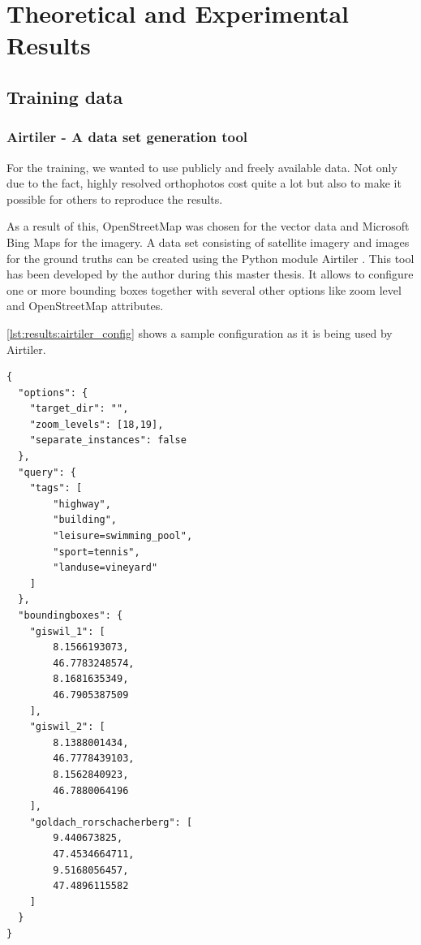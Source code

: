 
\chapter{Theoretical and Experimental Results}\label{chp:theoretical_and_experimental_results}
\section{Training data}
\subsection{Airtiler - A data set generation tool}
For the training, we wanted to use publicly and freely available data. Not only due to the fact, highly resolved orthophotos cost quite a lot but also to make it possible for others to reproduce the results.

As a result of this, OpenStreetMap was chosen for the vector data and Microsoft Bing Maps for the imagery. A data set consisting of satellite imagery and images for the ground truths can be created using the Python module Airtiler \cite{airtiler}. This tool has been developed by the author during this master thesis. It allows to configure one or more bounding boxes together with several other options like zoom level and OpenStreetMap attributes.

\autoref{lst:results:airtiler_config} shows a sample configuration as it is being used by Airtiler.

\begin{minipage}{\linewidth}
\begin{lstlisting}[caption={Sample configuration for Airtiler},captionpos=b,label=lst:results:airtiler_config]
{
  "options": {
    "target_dir": "",
    "zoom_levels": [18,19],
    "separate_instances": false
  },
  "query": {
    "tags": [
    	"highway",
    	"building",
    	"leisure=swimming_pool",
    	"sport=tennis",
    	"landuse=vineyard"
    ]
  },
  "boundingboxes": {
    "giswil_1": [
    	8.1566193073,
    	46.7783248574,
    	8.1681635349,
    	46.7905387509
    ],
    "giswil_2": [
    	8.1388001434,
    	46.7778439103,
    	8.1562840923,
    	46.7880064196
    ],
    "goldach_rorschacherberg": [
    	9.440673825,
    	47.4534664711,
    	9.5168056457,
    	47.4896115582
    ]
  }
}
\end{lstlisting}
\end{minipage}


